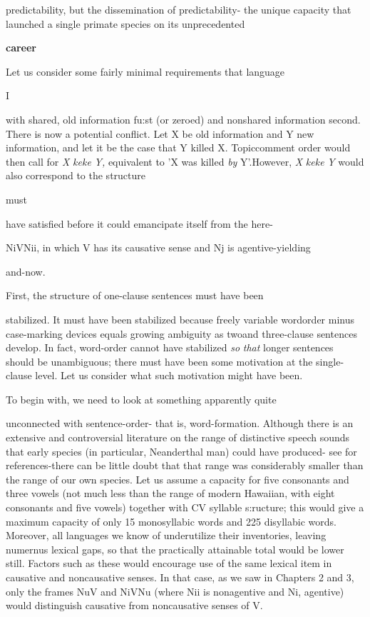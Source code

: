 predictability, but the dissemination of predictability- the unique capacity that launched a single primate species on its unprecedented

\bfseries
career

Let us consider some fairly minimal requirements that language

I


with shared, old information fu:st (or zeroed) and nonshared informa\-tion second. There is now a potential conflict. Let X be old information and Y new information, and let it be the case that Y killed X. Topic\-comment order would then call for \textit{X} \textit{keke} \textit{Y,} equivalent to 'X was killed \textit{by} Y'.However, \textit{X} \textit{keke} \textit{Y} would also correspond to the structure

must

have satisfied before it could emancipate itself from the here-

NiVNii, in which V has its causative sense and Nj is agentive-yielding

and-now.

First, the structure of one-clause sentences must have been

stabilized. It must have been stabilized because freely variable word\-order minus case-marking devices equals growing ambiguity as two\-and three-clause sentences develop. In fact, word-order cannot have stabilized \textit{so} \textit{that} longer sentences should be unambiguous; there must have been some motivation at the single-clause level. Let us consider what such motivation might have been.

To begin with, we need to look at something apparently quite

unconnected with sentence-order- that is, word-formation. Although there is an extensive and controversial literature on the range of distinc\-tive speech sounds that early species (in particular, Neanderthal man) could have produced- see \citet{Spuhler1977} for references-there can be little doubt that that range was considerably smaller than the range of our own species. Let us assume a capacity for five consonants and three vowels (not much less than the range of modern Hawaiian, with eight consonants and five vowels) together with CV syllable s:ructure; this would give a maximum capacity of only 15 monosyllabic words and 225 disyllabic words. Moreover, all languages we know of under\-utilize their inventories, leaving numernus lexical gaps, so that the practically attainable total would be lower still. Factors such as these would encourage use of the same lexical item in causative and non\-causative senses. In that case, as we saw in Chapters 2 and 3, only the frames NuV and NiVNu (where Nii is nonagentive and Ni, agentive) would distinguish causative from noncausative senses of V.

